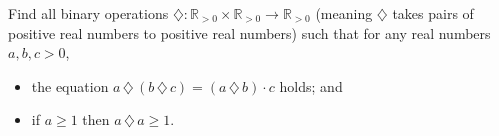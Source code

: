 Find all binary operations $\diamondsuit: \mathbb R_{>0}\times \mathbb R_{>0}\to \mathbb R_{>0}$ (meaning $\diamondsuit$ takes pairs of positive real numbers to positive real numbers) such that for any real numbers $a, b, c > 0$, 
\begin{itemize}
	\item the equation $a\,\diamondsuit\, (b\,\diamondsuit \,c) = (a\,\diamondsuit \,b)\cdot c$ holds; and
	\item if $a\ge 1$ then $a\,\diamondsuit\, a\ge 1$.
\end{itemize}